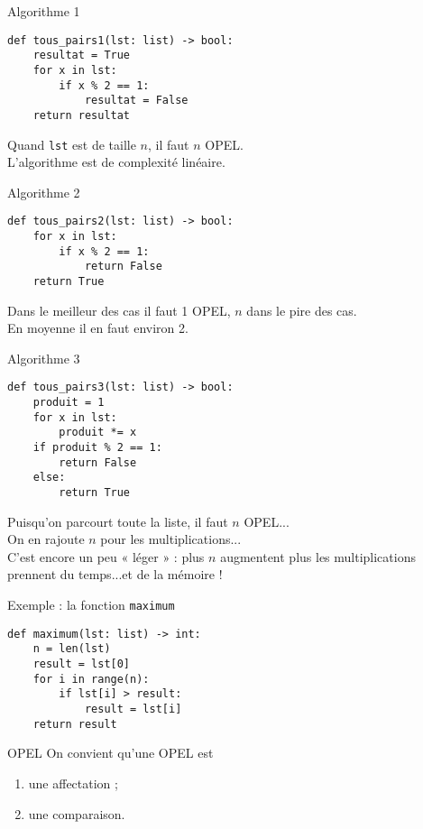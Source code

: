 \documentclass[12pt]{beamer}
\begin{document}
\begin{frame}[fragile]{Algorithme 1}
\begin{verbatim}
def tous_pairs1(lst: list) -> bool:
    resultat = True
    for x in lst:
        if x % 2 == 1:
            resultat = False
    return resultat
\end{verbatim}

\pause
Quand \texttt{lst} est de taille $n$, il faut $n$ \textsc{OPEL}.\\\pause
L'algorithme est de complexité linéaire.
\end{frame}

\begin{frame}[fragile]{Algorithme 2}
\begin{verbatim}
def tous_pairs2(lst: list) -> bool:
    for x in lst:
        if x % 2 == 1:
            return False
    return True
\end{verbatim}

\pause
Dans le meilleur des cas il faut 1 \textsc{OPEL}, $n$ dans le pire des cas.\\\pause
En moyenne il en faut environ 2.
\end{frame}

\begin{frame}[fragile]{Algorithme 3}
\begin{verbatim}
def tous_pairs3(lst: list) -> bool:
    produit = 1
    for x in lst:
        produit *= x
    if produit % 2 == 1:
        return False
    else:
        return True
\end{verbatim}
\pause
Puisqu'on parcourt toute la liste, il faut $n$ \textsc{OPEL}...\\\pause
On en rajoute $n$ pour les multiplications...\\\pause 
C'est encore un peu « léger » :  plus $n$ augmentent plus les multiplications prennent du temps...\pause et de la mémoire !
\end{frame}

\begin{frame}[fragile]{Exemple : la fonction \texttt{maximum}}
\begin{verbatim}
def maximum(lst: list) -> int:
    n = len(lst)
    result = lst[0]
    for i in range(n):
        if lst[i] > result:
            result = lst[i]
    return result
\end{verbatim}
\end{frame}
\begin{frame}{\textsc{OPEL}}
On convient qu'une \textsc{OPEL} est 
\begin{enumerate}[--]
	\item une affectation ;
    \item une comparaison.
\end{enumerate}
\end{frame}
\end{document}
